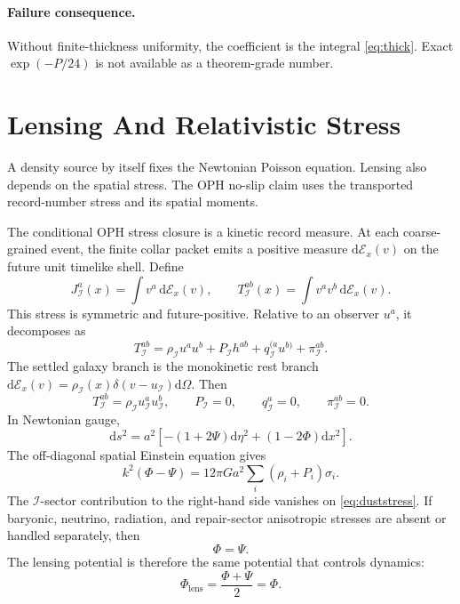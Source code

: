 \documentclass[11pt]{article}
\newcommand{\dd}{\mathrm{d}}
\begin{document}
\paragraph{Failure consequence.}
Without finite-thickness uniformity, the coefficient is the integral
\eqref{eq:thick}.  Exact \(\exp(-P/24)\) is not available as a theorem-grade
number.

\section{Lensing And Relativistic Stress}

A density source by itself fixes the Newtonian Poisson equation.  Lensing also
depends on the spatial stress.  The OPH no-slip claim uses the transported
record-number stress and its spatial moments.

The conditional OPH stress closure is a kinetic record measure.  At each
coarse-grained event, the finite collar packet emits a positive measure
\(\dd\mathcal E_x(v)\) on the future unit timelike shell.  Define
\begin{equation}
  J_{\mathcal I}^a(x)=\int v^a\,\dd\mathcal E_x(v),
  \qquad
  T_{\mathcal I}^{ab}(x)=\int v^a v^b\,\dd\mathcal E_x(v).
  \label{eq:kineticstress}
\end{equation}
This stress is symmetric and future-positive.  Relative to an observer
\(u^a\), it decomposes as
\begin{equation}
  T_{\mathcal I}^{ab}
  =
  \rho_{\mathcal I}u^a u^b
  +P_{\mathcal I}h^{ab}
  +q_{\mathcal I}^{(a}u^{b)}
  +\pi_{\mathcal I}^{ab}.
  \label{eq:stressdecomposition}
\end{equation}
The settled galaxy branch is the monokinetic rest branch
\(\dd\mathcal E_x(v)=\rho_{\mathcal I}(x)\delta(v-u_{\mathcal I})\dd\Omega\).
Then
\begin{equation}
  T_{\mathcal I}^{ab}
  =
  \rho_{\mathcal I}u_{\mathcal I}^a u_{\mathcal I}^b,
  \qquad
  P_{\mathcal I}=0,
  \qquad
  q_{\mathcal I}^a=0,
  \qquad
  \pi_{\mathcal I}^{ab}=0.
  \label{eq:duststress}
\end{equation}
In Newtonian gauge,
\begin{equation}
  \dd s^2
  =a^2[-(1+2\Psi)\dd\eta^2+(1-2\Phi)\dd x^2].
\end{equation}
The off-diagonal spatial Einstein equation gives
\begin{equation}
  k^2(\Phi-\Psi)
  =12\pi G a^2\sum_i(\rho_i+P_i)\sigma_i.
\end{equation}
The \(\mathcal I\)-sector contribution to the right-hand side vanishes on
\eqref{eq:duststress}.  If baryonic, neutrino, radiation, and repair-sector
anisotropic stresses are absent or handled separately, then
\begin{equation}
  \Phi=\Psi.
\end{equation}
The lensing potential is therefore the same potential that controls dynamics:
\begin{equation}
  \Phi_{\mathrm{lens}}=\frac{\Phi+\Psi}{2}=\Phi.
\end{equation}
\end{document}
